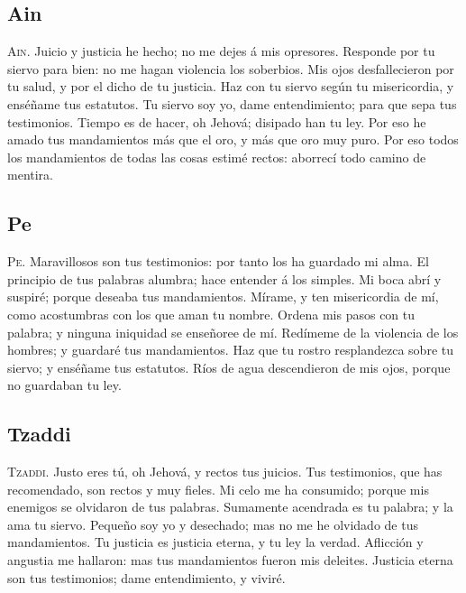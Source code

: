 \hypertarget{ain}{%
\subsection{Ain}\label{ain}}

 \textsc{Ain}. Juicio y justicia he hecho; no me dejes á
mis opresores.  Responde por tu siervo para bien: no me
hagan violencia los soberbios.  Mis ojos desfallecieron
por tu salud, y por el dicho de tu justicia.  Haz con tu
siervo según tu misericordia, y enséñame tus estatutos. 
Tu siervo soy yo, dame entendimiento; para que sepa tus testimonios.
 Tiempo es de hacer, oh Jehová; disipado han tu ley.
 Por eso he amado tus mandamientos más que el oro, y más
que oro muy puro.  Por eso todos los mandamientos de
todas las cosas estimé rectos: aborrecí todo camino de mentira.

\hypertarget{pe}{%
\subsection{Pe}\label{pe}}

 \textsc{Pe}. Maravillosos son tus testimonios: por
tanto los ha guardado mi alma.  El principio de tus
palabras alumbra; hace entender á los simples.  Mi boca
abrí y suspiré; porque deseaba tus mandamientos. 
Mírame, y ten misericordia de mí, como acostumbras con los que aman tu
nombre.  Ordena mis pasos con tu palabra; y ninguna
iniquidad se enseñoree de mí.  Redímeme de la violencia
de los hombres; y guardaré tus mandamientos.  Haz que tu
rostro resplandezca sobre tu siervo; y enséñame tus estatutos.
 Ríos de agua descendieron de mis ojos, porque no
guardaban tu ley.

\hypertarget{tzaddi}{%
\subsection{Tzaddi}\label{tzaddi}}

 \textsc{Tzaddi}. Justo eres tú, oh Jehová, y rectos tus
juicios.  Tus testimonios, que has recomendado, son
rectos y muy fieles.  Mi celo me ha consumido; porque
mis enemigos se olvidaron de tus palabras.  Sumamente
acendrada es tu palabra; y la ama tu siervo.  Pequeño
soy yo y desechado; mas no me he olvidado de tus mandamientos.
 Tu justicia es justicia eterna, y tu ley la verdad.
 Aflicción y angustia me hallaron: mas tus mandamientos
fueron mis deleites.  Justicia eterna son tus
testimonios; dame entendimiento, y viviré.

